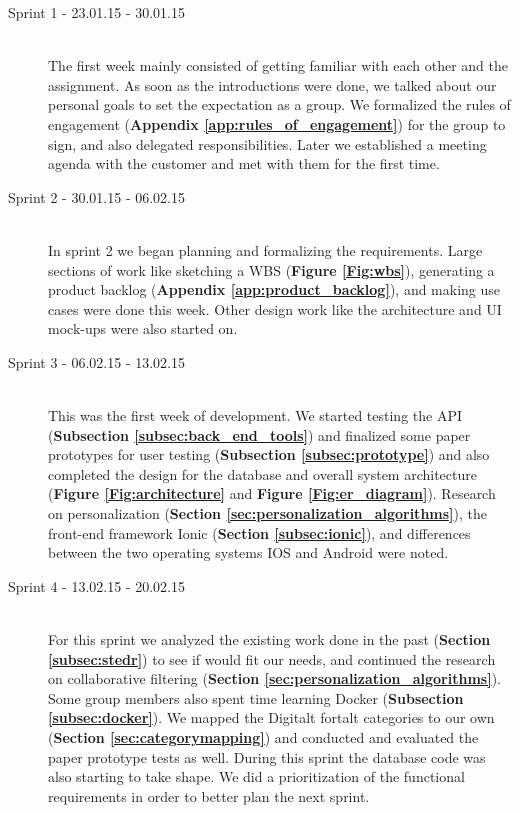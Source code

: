 \begin{description}
	
	\item[Sprint 1 - 23.01.15 - 30.01.15] \hfill \\ 
	The first week mainly consisted of getting familiar with each other and the assignment. As soon as the introductions were done, we talked about our personal goals to set the expectation as a group. We formalized the rules of engagement (\textbf{Appendix \ref{app:rules_of_engagement}}) for the group to sign, and also delegated responsibilities. Later we established a meeting agenda with the customer and met with them for the first time.
	
	\item[Sprint 2 - 30.01.15 - 06.02.15] \hfill \\ 
	In sprint 2 we began planning and formalizing the requirements. Large sections of work like sketching a WBS (\textbf{Figure \ref{Fig:wbs}}), generating a product backlog (\textbf{Appendix \ref{app:product_backlog}}), and making use cases were done this week. Other design work like the architecture and UI mock-ups were also started on.
	
	\item[Sprint 3 - 06.02.15 - 13.02.15] \hfill \\ 
	This was the first week of development. We started testing the API (\textbf{Subsection \ref{subsec:back_end_tools}}) and finalized some paper prototypes for user testing (\textbf{Subsection \ref{subsec:prototype}}) and also completed the design for the database and overall system architecture (\textbf{Figure \ref{Fig:architecture}} and \textbf{Figure \ref{Fig:er_diagram}}). Research on personalization (\textbf{Section \ref{sec:personalization_algorithms}}), the front-end framework Ionic (\textbf{Section \ref{subsec:ionic}}), and differences between the two operating systems IOS and Android were noted.
	
	\item[Sprint 4 - 13.02.15 - 20.02.15] \hfill \\ 
	For this sprint we analyzed the existing work done in the past (\textbf {Section \ref{subsec:stedr}}) to see if would fit our needs, and continued the research on collaborative filtering (\textbf {Section \ref{sec:personalization_algorithms}}). Some group members also spent time learning Docker (\textbf {Subsection \ref{subsec:docker}}). We mapped the Digitalt fortalt categories to our own (\textbf{Section \ref{sec:categorymapping}}) and conducted and evaluated the paper prototype tests as well. During this sprint the database code was also starting to take shape. We did a prioritization of the functional requirements in order to better plan the next sprint.  
	

\end{description}
